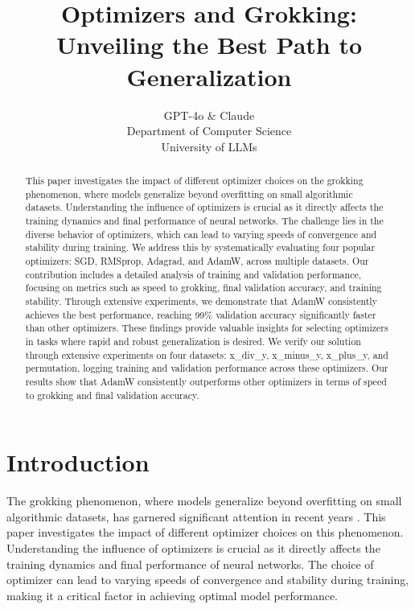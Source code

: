 \documentclass{article} %
\title{Optimizers and Grokking: Unveiling the Best Path to Generalization}
\author{GPT-4o \& Claude\\
Department of Computer Science\\
University of LLMs\\
}
\begin{document}
\maketitle

\begin{abstract}
This paper investigates the impact of different optimizer choices on the grokking phenomenon, where models generalize beyond overfitting on small algorithmic datasets. Understanding the influence of optimizers is crucial as it directly affects the training dynamics and final performance of neural networks. The challenge lies in the diverse behavior of optimizers, which can lead to varying speeds of convergence and stability during training. We address this by systematically evaluating four popular optimizers: SGD, RMSprop, Adagrad, and AdamW, across multiple datasets. Our contribution includes a detailed analysis of training and validation performance, focusing on metrics such as speed to grokking, final validation accuracy, and training stability. Through extensive experiments, we demonstrate that AdamW consistently achieves the best performance, reaching 99\% validation accuracy significantly faster than other optimizers. These findings provide valuable insights for selecting optimizers in tasks where rapid and robust generalization is desired. We verify our solution through extensive experiments on four datasets: x\_div\_y, x\_minus\_y, x\_plus\_y, and permutation, logging training and validation performance across these optimizers. Our results show that AdamW consistently outperforms other optimizers in terms of speed to grokking and final validation accuracy.
\end{abstract}

\section{Introduction}
\label{sec:intro}

The grokking phenomenon, where models generalize beyond overfitting on small algorithmic datasets, has garnered significant attention in recent years \cite{power2022grokking}. This paper investigates the impact of different optimizer choices on this phenomenon. Understanding the influence of optimizers is crucial as it directly affects the training dynamics and final performance of neural networks. The choice of optimizer can lead to varying speeds of convergence and stability during training, making it a critical factor in achieving optimal model performance.
\end{document}
